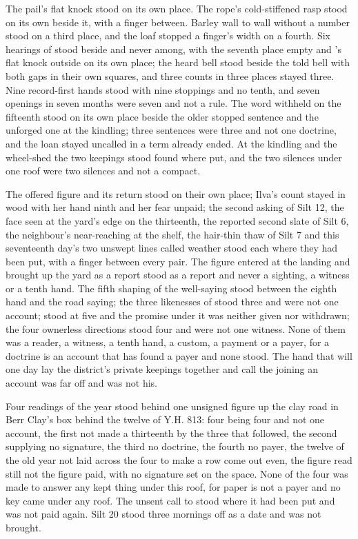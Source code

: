 The pail's flat knock stood on its own place. The rope's cold-stiffened rasp stood on its own beside it, with a finger between. Barley wall to wall without a number stood on a third place, and the loaf stopped a finger's width on a fourth. Six hearings of  stood beside and never among, with the seventh place empty and 's flat knock outside on its own place; the heard bell stood beside the told bell with both gaps in their own squares, and three counts in three places stayed three. Nine record-first hands stood with nine stoppings and no tenth, and seven openings in seven months were seven and not a rule. The word withheld on the fifteenth stood on its own place beside the older stopped sentence and the unforged one at the kindling; three sentences were three and not one doctrine, and the loan stayed uncalled in a term already ended. At the kindling and the wheel-shed the two keepings stood found where put, and the two silences under one roof were two silences and not a compact.

The offered figure and its return stood on their own place; Ilva's count stayed in wood with her hand ninth and her fear unpaid; the second asking of Silt 12, the face seen at the yard's edge on the thirteenth, the reported second slate of Silt 6, the neighbour's near-reaching at the shelf, the hair-thin thaw of Silt 7 and this seventeenth day's two unswept lines called weather stood each where they had been put, with a finger between every pair. The figure entered at the landing and brought up the yard as a report stood as a report and never a sighting, a witness or a tenth hand. The fifth shaping of the well-saying stood between the eighth hand and the road saying; the three likenesses of  stood three and were not one account;  stood at five and the promise under it was neither given nor withdrawn; the four ownerless directions stood four and were not one witness. None of them was a reader, a witness, a tenth hand, a custom, a payment or a payer, for a doctrine is an account that has found a payer and none stood. The hand that will one day lay the district's private keepings together and call the joining an account was far off and was not his.

Four readings of the year stood behind one unsigned figure up the clay road in Berr Clay's box behind the twelve of Y.H. 813: four being four and not one account, the first not made a thirteenth by the three that followed, the second supplying no signature, the third no doctrine, the fourth no payer, the twelve of the old year not laid across the four to make a row come out even, the figure read still not the figure paid, with no signature set on the space. None of the four was made to answer any kept thing under this roof, for paper is not a payer and no key came under any roof. The unsent call to  stood where it had been put and was not paid again. Silt 20 stood three mornings off as a date and was not brought.

